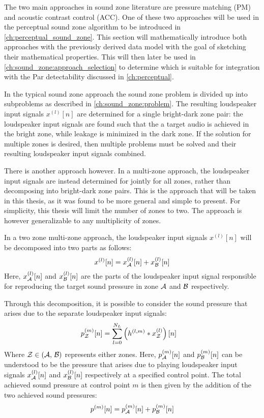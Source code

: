 The two main approaches in sound zone literature are pressure matching (PM) and acoustic contrast control (ACC).
One of these two approaches will be used in the perceptual sound zone algorithm to be introduced in \autoref{ch:perceptual_sound_zone}.
This section will mathematically introduce both approaches with the previously derived data model with the goal of sketching their mathematical properties.
This will then later be used in \autoref{ch:sound_zone:approach_selection} to determine  which is suitable for integration with the 
Par detectability discussed in \autoref{ch:perceptual}.

In the typical sound zone approach the sound zone problem is divided up into subproblems as described in \autoref{ch:sound_zone:problem}.
The resulting loudspeaker input signals $x^{(l)}[n]$ are determined for a single bright-dark zone pair:
the loudspeaker input signals are found such that the a target audio is achieved in the bright zone, while leakage is minimized in the dark zone.
If the solution for multiple zones is desired, then multiple problems must be solved and their resulting loudspeaker input signals combined.

There is another approach however.
In a multi-zone approach, the loudspeaker input signals are instead determined for jointly for all zones, rather than decomposing into bright-dark zone pairs.
This is the approach that will be taken in this thesis, as it was found to be more general and simple to present.
For simplicity, this thesis will limit the number of zones to two.
The approach is however generalizable to any multiplicity of zones.

In a two zone multi-zone approach, the loudspeaker input signals $x^{(l)}[n]$ will be decomposed into two parts as follows:
\begin{equation}
    x^{(l)}[n] = x_{\mathcal{A}}^{(l)}[n] + x_{\mathcal{B}}^{(l)}[n]
\end{equation}
Here, $x_{\mathcal{A}}^{(l)}[n]$ and $x_{\mathcal{B}}^{(l)}[n]$ are the parts of the loudspeaker input signal responsible for reproducing the target sound pressure 
in zone $\mathcal{A}$ and $\mathcal{B}$ respectively.

Through this decomposition, it is possible to consider the sound pressure that arises due to the separate loudspeaker input signals:
\begin{align}
    p_{\mathcal{Z}}^{(m)}[n] &= \sum_{l=0}^{N_L} \left(h^{(l,m)} \ast x_{\mathcal{Z}}^{(l)}\right)[n] 
\end{align}
\label{eq:sound_zone:approaches:pressure}
Where $\mathcal{Z} \in \left(\mathcal{A},\,\mathcal{B}\right)$ represents either zones.
Here, $p_{\mathcal{A}}^{(m)}[n]$ and $p_{\mathcal{B}}^{(m)}[n]$ can be understood to be the pressure that arises due to 
playing loudspeaker input signals $x_{\mathcal{A}}^{(l)}[n]$ and $x_{\mathcal{B}}^{(l)}[n]$ respectively at a specified control point. 
The total achieved sound pressure at control point $m$ is then given by the addition of the two achieved sound pressures:
\begin{equation}
    p^{(m)}[n] = p_{\mathcal{A}}^{(m)}[n] + p_{\mathcal{B}}^{(m)}[n]
\end{equation}


